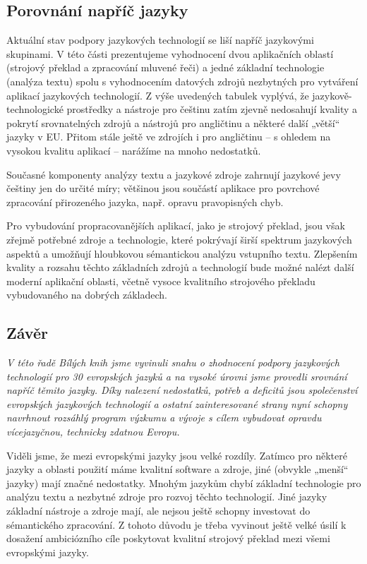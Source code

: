 \begin{multicols}{2}
\subsection{Porovnání napříč jazyky}

Aktuální stav podpory jazykových technologií se liší napříč jazykovými skupinami. V této části prezentujeme vyhodnocení dvou aplikačních oblastí (strojový překlad a zpracování mluvené řeči) a jedné základní technologie (analýza textu) spolu s vyhodnocením datových zdrojů nezbytných pro vytváření aplikací jazykových technologií. 
Z výše uvedených tabulek vyplývá, že jazykově-technologické prostředky a nástroje pro češtinu zatím zjevně nedosahují kvality a pokrytí srovnatelných zdrojů a nástrojů pro angličtinu a některé další „větší“ jazyky v EU. Přitom stále ještě ve zdrojích i pro angličtinu – s ohledem na vysokou kvalitu aplikací – narážíme na mnoho nedostatků.

Současné komponenty analýzy textu a jazykové zdroje zahrnují jazykové jevy češtiny jen do určité míry; většinou jsou součástí aplikace pro povrchové zpracování přirozeného jazyka, např. opravu pravopisných chyb.

Pro vybudování propracovanějších aplikací, jako je strojový překlad, jsou však zřejmě potřebné zdroje a technologie, které pokrývají širší spektrum jazykových aspektů a umožňují hloubkovou sémantickou analýzu vstupního textu. Zlepšením kvality a rozsahu těchto základních zdrojů a technologií bude možné nalézt další moderní aplikační oblasti, včetně vysoce kvalitního strojového překladu vybudovaného na dobrých základech.

\subsection{Závěr}

\emph{V této řadě Bílých knih jsme vyvinuli snahu o zhodnocení podpory jazykových technologií pro 30 evropských jazyků a na vysoké úrovni jsme provedli srovnání napříč těmito jazyky. Díky nalezení nedostatků, potřeb a deficitů jsou společenství evropských jazykových technologií a ostatní zainteresované strany nyní schopny navrhnout rozsáhlý program výzkumu a vývoje s cílem vybudovat opravdu vícejazyčnou, technicky zdatnou Evropu.}

Viděli jsme, že mezi evropskými jazyky jsou velké rozdíly. Zatímco pro některé jazyky a oblasti použití máme kvalitní software a zdroje, jiné (obvykle „menší“ jazyky) mají značné nedostatky. Mnohým jazykům chybí základní technologie pro analýzu textu a nezbytné zdroje pro rozvoj těchto technologií. Jiné jazyky základní nástroje a zdroje mají, ale nejsou ještě schopny investovat do sémantického zpracování. Z tohoto důvodu je třeba vyvinout ještě velké úsilí k dosažení ambiciózního cíle poskytovat kvalitní strojový překlad mezi všemi evropskými jazyky. 


\end{multicols}
